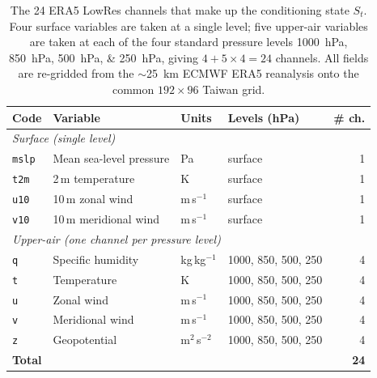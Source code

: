 %

\begin{table}[htbp]
  \centering
  \caption[ERA5 LowRes conditioning variables]{The 24 ERA5 LowRes channels that
  make up the conditioning state $S_t$. Four surface variables are taken at a
  single level; five upper-air variables are taken at each of the four standard
  pressure levels \SIlist{1000;850;500;250}{\hecto\pascal}, giving
  $4 + 5\times4 = 24$ channels. All fields are re-gridded from the
  $\sim$\SI{25}{\kilo\metre} ECMWF ERA5 reanalysis onto the common
  $192\times96$ Taiwan grid.}
  \label{tab:era5-vars}
  \small
  \begin{tabular}{llll r}
    \toprule
    Code & Variable & Units & Levels (hPa) & \# ch. \\
    \midrule
    \multicolumn{5}{l}{\emph{Surface (single level)}} \\
    \texttt{mslp} & Mean sea-level pressure & Pa                 & surface & 1 \\
    \texttt{t2m}  & 2\,m temperature        & K                  & surface & 1 \\
    \texttt{u10}  & 10\,m zonal wind        & m\,s$^{-1}$        & surface & 1 \\
    \texttt{v10}  & 10\,m meridional wind   & m\,s$^{-1}$        & surface & 1 \\
    \midrule
    \multicolumn{5}{l}{\emph{Upper-air (one channel per pressure level)}} \\
    \texttt{q} & Specific humidity   & kg\,kg$^{-1}$    & 1000, 850, 500, 250 & 4 \\
    \texttt{t} & Temperature         & K                & 1000, 850, 500, 250 & 4 \\
    \texttt{u} & Zonal wind          & m\,s$^{-1}$      & 1000, 850, 500, 250 & 4 \\
    \texttt{v} & Meridional wind     & m\,s$^{-1}$      & 1000, 850, 500, 250 & 4 \\
    \texttt{z} & Geopotential        & m$^2$\,s$^{-2}$  & 1000, 850, 500, 250 & 4 \\
    \midrule
    \multicolumn{4}{l}{\textbf{Total}} & \textbf{24} \\
    \bottomrule
  \end{tabular}
\end{table}
